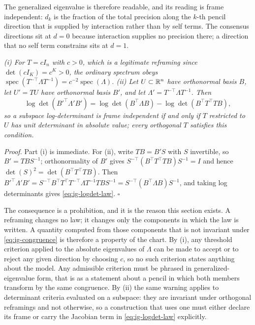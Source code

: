 \medskip
The generalized eigenvalue is therefore readable, and its reading is frame independent: $d_k$ is the fraction of the total precision along the $k$-th pencil direction that is supplied by interaction rather than by self terms. The consensus directions sit at $d=0$ because interaction supplies no precision there; a direction that no self term constrains sits at $d=1$.

\medskip
{}
\emph{(i) For $T=cI_{n}$ with $c>0$, which is a legitimate reframing since $\det(cI_K)=c^{K}>0$, the ordinary spectrum obeys $\operatorname{spec}\left(T^{-\top}\Lambda T^{-1}\right)=c^{-2}\operatorname{spec}(\Lambda)$. (ii) Let $U\subset\mathbb R^{n}$ have orthonormal basis $B$, let $U'=TU$ have orthonormal basis $B'$, and let $\Lambda'=T^{-\top}\Lambda T^{-1}$. Then}
\begin{equation}
\log\det\left(B'^\top\Lambda'B'\right)
=\log\det\left(B^\top\Lambda B\right)-\log\det\left(B^\top T^\top TB\right),
\label{eq:ig-logdet-law}
\end{equation}
\emph{so a subspace log-determinant is frame independent if and only if $T$ restricted to $U$ has unit determinant in absolute value; every orthogonal $T$ satisfies this condition.}

\noindent\emph{Proof.} Part (i) is immediate. For (ii), write $TB=B'S$ with $S$ invertible, so $B'=TBS^{-1}$; orthonormality of $B'$ gives $S^{-\top}\left(B^\top T^\top TB\right)S^{-1}=I$ and hence $\det(S)^2=\det\left(B^\top T^\top TB\right)$. Then $B'^\top\Lambda'B'=S^{-\top}B^\top T^\top T^{-\top}\Lambda T^{-1}TBS^{-1}=S^{-\top}\left(B^\top\Lambda B\right)S^{-1}$, and taking log determinants gives \eqref{eq:ig-logdet-law}. \hfill$\square$

\medskip
The consequence is a prohibition, and it is the reason this section exists. A reframing changes no law; it changes only the components in which the law is written. A quantity computed from those components that is not invariant under \eqref{eq:ig-congruence} is therefore a property of the chart. By (i), any threshold criterion applied to the absolute eigenvalues of $\Lambda$ can be made to accept or to reject any given direction by choosing $c$, so no such criterion states anything about the model. Any admissible criterion must be phrased in generalized-eigenvalue form, that is as a statement about a pencil in which both members transform by the same congruence. By (ii) the same warning applies to determinant criteria evaluated on a subspace: they are invariant under orthogonal reframings and not otherwise, so a construction that uses one must either declare its frame or carry the Jacobian term in \eqref{eq:ig-logdet-law} explicitly. 

